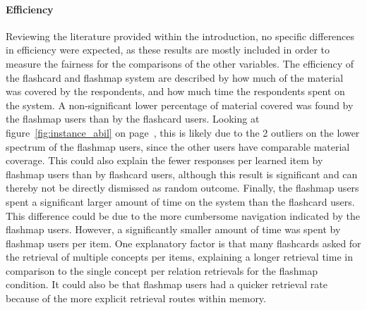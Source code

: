 \paragraph{Efficiency} Reviewing the literature provided within the introduction, no specific differences in efficiency were expected, as these results are mostly included in order to measure the fairness for the comparisons of the other variables. The efficiency of the flashcard and flashmap system are described by how much of the material was covered by the respondents, and how much time the respondents spent on the system. A non-significant lower percentage of material covered was found by the flashmap users than by the flashcard users. Looking at figure~\ref{fig:instance_abil} on page~\pageref{fig:instance_abil}, this is likely due to the 2 outliers on the lower spectrum of the flashmap users, since the other users have comparable material coverage. This could also explain the fewer responses per learned item by flashmap users than by flashcard users, although this result is significant and can thereby not be directly dismissed as random outcome. Finally, the flashmap users spent a significant larger amount of time on the system than the flashcard users. This difference could be due to the more cumbersome navigation indicated by the flashmap users. However, a significantly smaller amount of time was spent by flashmap users per item. One explanatory factor is that many flashcards asked for the retrieval of multiple concepts per items, explaining a longer retrieval time in comparison to the single concept per relation retrievals for the flashmap condition. It could also be that flashmap users had a quicker retrieval rate because of the more explicit retrieval routes within memory.

